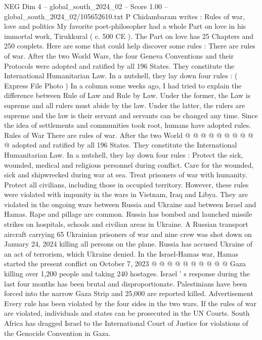 \begin{textsample}{NEG Dim 4 – global\_south\_2024\_02 – Score 1.00 – global\_south\_2024\_02/105652610.txt}  \label{ex:f4_neg_381}
P Chidambaram writes : Rules of war, love and politics My favorite poet-philosopher had a whole Part on love in his immortal work, Tirukkural ( c. 500 CE ).
The Part on love has 25 Chapters and 250 couplets.
Here are some that could help discover some rules : There are rules of war.
After the two World Wars, the four Geneva Conventions and their Protocols were adopted and ratified by all 196 States.
They constitute the International Humanitarian Law.
In a nutshell, they lay down four rules : ( Express File Photo ) In a column some weeks ago, I had tried to explain the difference between Rule of Law and Rule by Law.
Under the former, the Law is supreme and all rulers must abide by the law.
Under the latter, the rulers are supreme and the law is their servant and servants can be changed any time.
Since the idea of settlements and communities took root, humans have adopted rules.
Rules of War There are rules of war.
After the two World @ @ @ @ @ @ @ @ @ @ adopted and ratified by all 196 States.
They constitute the International Humanitarian Law.
In a nutshell, they lay down four rules : Protect the sick, wounded, medical and religious personnel during conflict.
Care for the wounded, sick and shipwrecked during war at sea.
Treat prisoners of war with humanity.
Protect all civilians, including those in occupied territory.
However, these rules were violated with impunity in the wars in Vietnam, Iraq and Libya.
They are violated in the ongoing wars between Russia and Ukraine and between Israel and Hamas.
Rape and pillage are common.
Russia has bombed and launched missile strikes on hospitals, schools and civilian areas in Ukraine.
A Russian transport aircraft carrying 65 Ukrainian prisoners of war and nine crew was shot down on January 24, 2024 killing all persons on the plane.
Russia has accused Ukraine of an act of terrorism, which Ukraine denied.
In the Israel-Hamas war, Hamas started the present conflict on October 7, 2023 @ @ @ @ @ @ @ @ @ @ Gaza killing over 1,200 people and taking 240 hostages.
Israel ' s response during the last four months has been brutal and disproportionate.
Palestinians have been forced into the narrow Gaza Strip and 25,000 are reported killed.
Advertisement Every rule has been violated by the four sides in the two wars.
If the rules of war are violated, individuals and states can be prosecuted in the UN Courts.
South Africa has dragged Israel to the International Court of Justice for violations of the Genocide Convention in Gaza.

\end{textsample}
